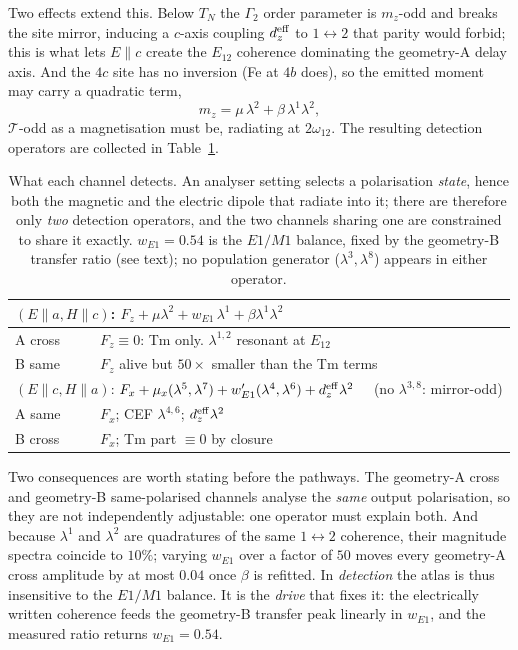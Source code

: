 \documentclass[aps,prb,twocolumn,superscriptaddress,longbibliography]{revtex4-2}
\begin{document}
Two effects extend this.  Below $T_N$ the $\Gamma_2$ order parameter is
$m_z$-odd and breaks the site mirror, inducing a $c$-axis coupling
$d_z^{\rm eff}$ to $1\!\leftrightarrow\!2$ that parity would forbid; this
is what lets $E\!\parallel\!c$ create the $E_{12}$ coherence dominating
the geometry-A delay axis.  And the $4c$ site has no inversion (Fe at
$4b$ does), so the emitted moment may carry a quadratic term,
\begin{equation}
  m_z=\mu\,\lambda^2+\beta\,\lambda^1\lambda^2 ,
  \label{eq:hyper}
\end{equation}
$\mathcal T$-odd as a magnetisation must be, radiating at $2\omega_{12}$.
The resulting detection operators are collected in
Table~\ref{tab:channels}.

\begin{table}[b]
\caption{What each channel detects.  An analyser setting selects a
polarisation \emph{state}, hence both the magnetic and the electric
dipole that radiate into it; there are therefore only \emph{two}
detection operators, and the two channels sharing one are constrained to
share it exactly.  $w_{E1}=0.54$ is the $E1/M1$ balance, fixed by the
geometry-B transfer ratio (see text); no population generator
($\lambda^{3},\lambda^8$) appears in either operator.}
\label{tab:channels}
\centering\small
\renewcommand{\arraystretch}{1.3}
\begin{tabular}{ll}
\hline
\multicolumn{2}{l}{$(E\!\parallel\!a,H\!\parallel\!c)$:\quad
  $F_z+\mu\lambda^2
   +w_{E1}\,\lambda^1
   +\beta\lambda^1\lambda^2$}\\
\hline
A cross & $F_z\equiv0$: Tm only.  $\lambda^{1,2}$ resonant at $E_{12}$\\
B same & $F_z$ alive but $50\times$ smaller than the Tm terms\\
\hline
\multicolumn{2}{l}{$(E\!\parallel\!c,H\!\parallel\!a)$:\quad
  $F_x+\mu_{x}(\lambda^5,\lambda^7)
   +w_{E1}'(\lambda^4,\lambda^6)
   +d_z^{\rm eff}\lambda^2$
  \ \ (no $\lambda^{3,8}$: mirror-odd)}\\
\hline
A same & $F_x$; CEF $\lambda^{4,6}$; $d_z^{\rm eff}\lambda^2$\\
B cross & $F_x$; Tm part $\equiv0$ by closure\\
\hline
\end{tabular}
\end{table}

Two consequences are worth stating before the pathways.  The
geometry-A cross and geometry-B same-polarised channels analyse the
\emph{same} output polarisation, so they are not independently
adjustable: one operator must explain both.  And because $\lambda^1$
and $\lambda^2$ are quadratures of the same $1\!\leftrightarrow\!2$
coherence, their magnitude spectra coincide to $10\%$; varying $w_{E1}$
over a factor of $50$ moves every geometry-A cross amplitude by at most
$0.04$ once $\beta$ is refitted.  In \emph{detection} the atlas is thus
insensitive to the $E1/M1$ balance.  It is the \emph{drive} that fixes
it: the electrically written coherence feeds the geometry-B transfer
peak linearly in $w_{E1}$, and the measured ratio returns
$w_{E1}=0.54$.
\end{document}
